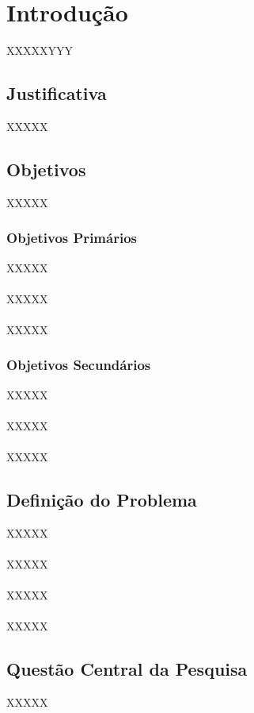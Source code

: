 \chapter{Introdução}
\label{Cap:Intro}


XXXXXYYY

\section{Justificativa}

XXXXX

\section{Objetivos}

XXXXX

\subsection{Objetivos Primários}

XXXXX
\\\\
XXXXX
\\\\
XXXXX

\subsection{Objetivos Secundários}

XXXXX
\\\\
XXXXX
\\\\
XXXXX

\section{Definição do Problema}
XXXXX
\\\\
XXXXX
\\\\
XXXXX
\\\\
XXXXX

\section{Questão Central da Pesquisa}

XXXXX


